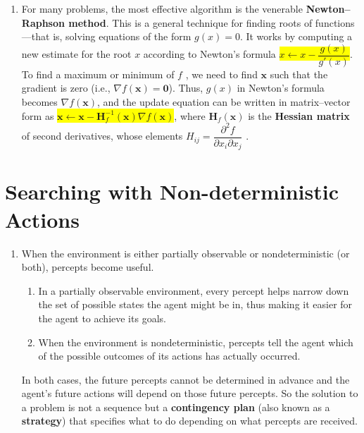 \begin{enumerate}
    \item For many problems, the most effective algorithm is the venerable \textbf{Newton–Raphson method}. 
    This is a general technique for finding roots of functions—that is, solving equations of the form $g(x) = 0$. 
    It works by computing a new estimate for the root $x$ according to Newton’s formula \colorbox{yellow}{$x \gets x - \dfrac{g(x)}{g'(x)}$}.
    To find a maximum or minimum of $f$ , we need to find $\bm{x}$ such that the gradient is zero (i.e., $\nabla f (\bm{x}) = \bm{0}$). 
    Thus, $g(x)$ in Newton’s formula becomes $\nabla f (\bm{x})$, and the update equation can be written in matrix–vector form as \colorbox{yellow}{$\bm{x} \gets \bm{x} - \bm{H}_f^{-1}(\bm{x})\nabla f(\bm{x})$}, where $\bm{H}_f (\bm{x})$ is the \textbf{Hessian matrix} of second derivatives, whose elements $H_{ij} = \dfrac{ \partial ^2f}{ \partial x_i \partial x_j}$ . 
    \hfill \cite{ai/book/Artificial-Intelligence-A-Modern-Approach/Russell-Norvig}
\end{enumerate}



\clearpage
\section{Searching with Non-deterministic Actions}

\begin{enumerate}
    \item When the environment is either partially observable or nondeterministic (or both), percepts become useful.
    \hfill \cite{ai/book/Artificial-Intelligence-A-Modern-Approach/Russell-Norvig}
    \begin{enumerate}
        \item In a partially observable environment, every percept helps narrow down the set of possible states the agent might be in, thus making it easier for the agent to achieve its goals. 
        \hfill \cite{ai/book/Artificial-Intelligence-A-Modern-Approach/Russell-Norvig}

        \item When the environment is nondeterministic, percepts tell the agent which of the possible outcomes of its actions has actually occurred. 
        \hfill \cite{ai/book/Artificial-Intelligence-A-Modern-Approach/Russell-Norvig}
    \end{enumerate}
    In both cases, the future percepts cannot be determined in advance and the agent’s future actions will depend on those future percepts.
    So the solution to a problem is not a sequence but a \textbf{contingency plan} (also known as a \textbf{strategy}) that specifies what to do depending on what percepts are received.
    \hfill \cite{ai/book/Artificial-Intelligence-A-Modern-Approach/Russell-Norvig}
\end{enumerate}













\clearpage


